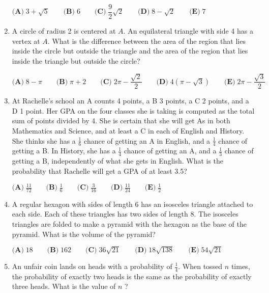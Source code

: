 \documentclass{article}
\begin{document}
\begin{enumerate}[label=\arabic*., itemsep=0.5em]
$\textbf{(A)}\; 3+\sqrt{5} \qquad\textbf{(B)}\; 6 \qquad\textbf{(C)}\; \dfrac{9}{2}\sqrt{2} \qquad\textbf{(D)}\; 8-\sqrt{2} \qquad\textbf{(E)}\; 7$\par \vspace{0.5em}\item A circle of radius 2 is centered at $A$. An equilateral triangle with side 4 has a vertex at $A$. What is the difference between the area of the region that lies inside the circle but outside the triangle and the area of the region that lies inside the triangle but outside the circle?

$\textbf{(A)}\; 8-\pi \qquad\textbf{(B)}\; \pi+2 \qquad\textbf{(C)}\; 2\pi-\dfrac{\sqrt{2}}{2} \qquad\textbf{(D)}\; 4(\pi-\sqrt{3}) \qquad\textbf{(E)}\; 2\pi-\dfrac{\sqrt{3}}{2}$\par \vspace{0.5em}\item At Rachelle's school an A counts 4 points, a B 3 points, a C 2 points, and a D 1 point. Her GPA on the four classes she is taking is computed as the total sum of points divided by 4. She is certain that she will get As in both Mathematics and Science, and at least a C in each of English and History. She thinks she has a $\tfrac{1}{6}$ chance of getting an A in English, and a $\tfrac{1}{4}$ chance of getting a B. In History, she has a $\tfrac{1}{4}$ chance of getting an A, and a $\tfrac{1}{3}$ chance of getting a B, independently of what she gets in English. What is the probability that Rachelle will get a GPA of at least 3.5?

$\textbf{(A)}\; \frac{11}{72} \qquad\textbf{(B)}\; \frac{1}{6} \qquad\textbf{(C)}\; \frac{3}{16} \qquad\textbf{(D)}\; \frac{11}{24} \qquad\textbf{(E)}\; \frac{1}{2}$\par \vspace{0.5em}\item A regular hexagon with sides of length 6 has an isosceles triangle attached to each side. Each of these triangles has two sides of length 8. The isosceles triangles are folded to make a pyramid with the hexagon as the base of the pyramid. What is the volume of the pyramid?

$\textbf{(A)}\; 18 \qquad\textbf{(B)}\; 162 \qquad\textbf{(C)}\; 36\sqrt{21} \qquad\textbf{(D)}\; 18\sqrt{138} \qquad\textbf{(E)}\; 54\sqrt{21}$\par \vspace{0.5em}\item An unfair coin lands on heads with a probability of $\tfrac{1}{4}$. When tossed $n$ times, the probability of exactly two heads is the same as the probability of exactly three heads. What is the value of $n$ ?


\end{enumerate}
\end{document}
